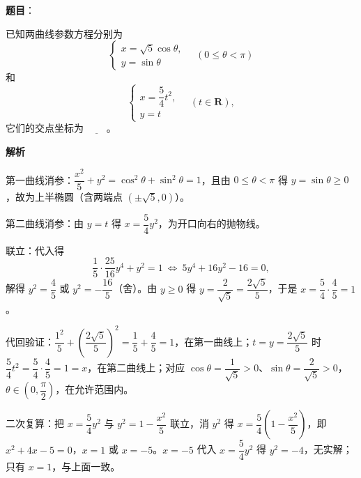 \begin{answer}

\textbf{题目}：

已知两曲线参数方程分别为
\nopagebreak[4]
\[\begin{cases}
x=\sqrt5\cos\theta,\\
y=\sin\theta
\end{cases}\quad(0\leqslant\theta<\pi)\]
和
\nopagebreak[4]
\[\begin{cases}
x=\dfrac54t^2,\\
y=t
\end{cases}\quad(t\in\mathbf R),\]
它们的交点坐标为 $\underline{\qquad}$。

\textbf{解析}

第一曲线消参：$\dfrac{x^2}{5}+y^2=\cos^2\theta+\sin^2\theta=1$，且由 $0\leqslant\theta<\pi$ 得 $y=\sin\theta\geqslant0$，故为上半椭圆（含两端点 $(\pm\sqrt5,0)$）。

第二曲线消参：由 $y=t$ 得 $x=\dfrac54y^2$，为开口向右的抛物线。

联立：代入得
\nopagebreak[4]
\[\frac{1}{5}\cdot\frac{25}{16}y^4+y^2=1\ \Longleftrightarrow\ 5y^4+16y^2-16=0,\]
解得 $y^2=\dfrac45$ 或 $y^2=-\dfrac{16}{5}$（舍）。由 $y\geqslant0$ 得 $y=\dfrac{2}{\sqrt5}=\dfrac{2\sqrt5}{5}$，于是 $x=\dfrac54\cdot\dfrac45=1$。

代回验证：$\dfrac{1^2}{5}+\left(\dfrac{2\sqrt5}{5}\right)^2=\dfrac15+\dfrac45=1$，在第一曲线上；$t=y=\dfrac{2\sqrt5}{5}$ 时 $\dfrac54t^2=\dfrac54\cdot\dfrac45=1=x$，在第二曲线上；对应 $\cos\theta=\dfrac{1}{\sqrt5}>0$、$\sin\theta=\dfrac{2}{\sqrt5}>0$，$\theta\in\left(0,\dfrac{\pi}{2}\right)$，在允许范围内。

二次复算：把 $x=\dfrac54y^2$ 与 $y^2=1-\dfrac{x^2}{5}$ 联立，消 $y^2$ 得 $x=\dfrac54\left(1-\dfrac{x^2}{5}\right)$，即 $x^2+4x-5=0$，$x=1$ 或 $x=-5$。$x=-5$ 代入 $x=\dfrac54y^2$ 得 $y^2=-4$，无实解；只有 $x=1$，与上面一致。


\end{answer}
